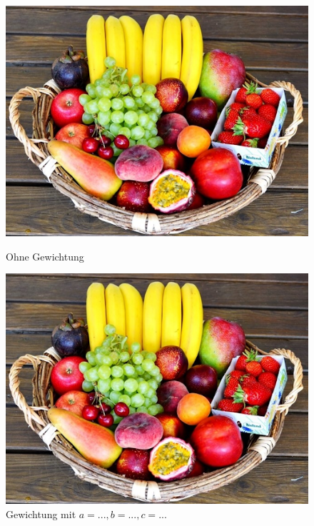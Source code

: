 \documentclass[course=erap]{aspdoc}
\begin{document}
	\begin{figure}[h]
		\begin{minipage}{0.49\linewidth}
			\centering
			\includegraphics[scale=1.2]{Images/fruit_basket_original.png}
			\caption{Ohne Gewichtung}
		\end{minipage}
		\centering
		\begin{minipage}{0.49\linewidth}
			\centering
			\includegraphics[scale=1.2]{Images/fruit_basket_original.png}
			\caption{Gewichtung mit $a=..., b=..., c=...$}
		\end{minipage}
	\end{figure}
\end{document}
